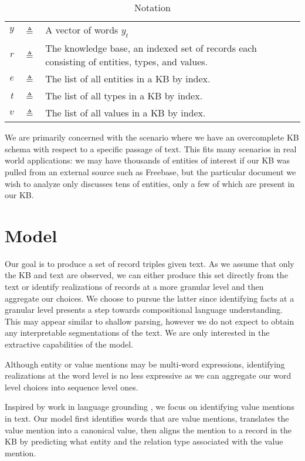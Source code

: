 \documentclass[12pt]{article}
\begin{document}
\begin{table}[htbp]\caption{Notation}
\centering %
\begin{tabular}{r c p{10cm} }
\toprule
$y$ & $\triangleq$ & A vector of words $y_t$\\
$r$ & $\triangleq$ & The knowledge base,
    an indexed set of records each consisting of entities, types, and values.\\
$e$ & $\triangleq$ & The list of all entities in a KB by index.\\
$t$ & $\triangleq$ & The list of all types in a KB by index.\\
$v$ & $\triangleq$ & The list of all values in a KB by index.\\
\bottomrule
\end{tabular}
\label{tab:TableOfNotationForMyResearch}
\end{table}

We are primarily concerned with the scenario where we have an overcomplete KB schema with
respect to a specific passage of text.
This fits many scenarios in real world applications:
we may have thousands of entities of interest if our KB was pulled from an 
external source such as Freebase,
but the particular document we wish to analyze only discusses tens of entities,
only a few of which are present in our KB.

\section{Model}
Our goal is to produce a set of record triples given text.
As we assume that only the KB and text are observed,
we can either produce this set directly from the text or identify realizations of
records at a more granular level and then aggregate our choices.
We choose to pursue the latter since identifying facts at a granular level
presents a step towards compositional language understanding.
This may appear similar to shallow parsing, however we do not expect
to obtain any interpretable segmentations of the text.
We are only interested in the extractive capabilities of the model.

Although entity or value mentions may be multi-word expressions,
identifying realizations at the word level is no less expressive as
we can aggregate our word level choices into sequence level ones.

Inspired by work in language grounding \cite{liang2009},
we focus on identifying value mentions in text.
Our model first identifies words that are value mentions,
translates the value mention into a canonical value,
then aligns the mention to a record in the KB by predicting what
entity and the relation type associated with the value mention.
\end{document}
